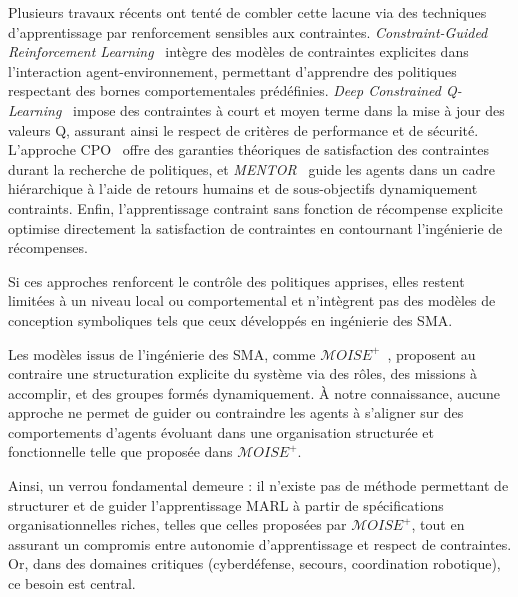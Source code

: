 \noindent
Plusieurs travaux récents ont tenté de combler cette lacune via des techniques d'apprentissage par renforcement sensibles aux contraintes. \textit{Constraint-Guided Reinforcement Learning}~\cite{spieker2021constraint} intègre des modèles de contraintes explicites dans l'interaction agent-environnement, permettant d'apprendre des politiques respectant des bornes comportementales prédéfinies. \textit{Deep Constrained Q-Learning}~\cite{kalweit2020deep} impose des contraintes à court et moyen terme dans la mise à jour des valeurs Q, assurant ainsi le respect de critères de performance et de sécurité. L'approche \ac{CPO}~\cite{achiam2017constrained} offre des garanties théoriques de satisfaction des contraintes durant la recherche de politiques, et \textit{MENTOR}~\cite{zhou2025mentor} guide les agents dans un cadre hiérarchique à l'aide de retours humains et de sous-objectifs dynamiquement contraints. Enfin, l'apprentissage contraint sans fonction de récompense explicite~\cite{miryoosefi2022} optimise directement la satisfaction de contraintes en contournant l'ingénierie de récompenses.

\medskip

\noindent
Si ces approches renforcent le contrôle des politiques apprises, elles restent limitées à un niveau local ou comportemental et n'intègrent pas des modèles de conception symboliques tels que ceux développés en ingénierie des \ac{SMA}.

\medskip

\noindent
Les modèles issus de l'ingénierie des \ac{SMA}, comme \textit{$\mathcal{M}OISE^+$}~\cite{hubner2002moise}, proposent au contraire une structuration explicite du système via des rôles, des missions à accomplir, et des groupes formés dynamiquement. À notre connaissance, aucune approche ne permet de guider ou contraindre les agents à s'aligner sur des comportements d'agents évoluant dans une organisation structurée et fonctionnelle telle que proposée dans $\mathcal{M}OISE^+$. 



\medskip

\noindent
Ainsi, un verrou fondamental demeure : il n'existe pas de méthode permettant de structurer et de guider l'apprentissage \ac{MARL} à partir de spécifications organisationnelles riches, telles que celles proposées par $\mathcal{M}OISE^+$, tout en assurant un compromis entre autonomie d'apprentissage et respect de contraintes. Or, dans des domaines critiques (cyberdéfense, secours, coordination robotique), ce besoin est central.


